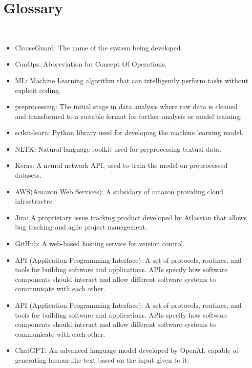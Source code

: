 \chapter{Glossary 
\label{Chapter::Glossary}}\
\begin{itemize}
    \item ClauseGuard: The name of the system being developed. 

    \item ConOps: Abbreviation for Concept Of Operations. 

    \item ML: Machine Learning algorithm that can intelligently perform tasks without explicit coding.
    \item preprocessing: The initial stage in data analysis where raw data is cleaned and transformed to a suitable format for further analysis or model training.



    \item scikit-learn: Python library used for developing the machine learning model. 

    \item NLTK: Natural language toolkit used for preprocessing textual data.  
    \item Keras: A neural network API, used to train the model on preprocessed datasets. 
    \item AWS(Amazon Web Services): A subsidary of amazon providing cloud infrastructre. 
    \item Jira: A proprietary issue tracking product developed by Atlassian that allows bug tracking and agile project management.
    \item GitHub: A web-based hosting service for version control. 

    \item API (Application Programming Interface): A set of protocols, routines, and tools for building software and applications. APIs specify how software components should interact and allow different software systems to communicate with each other.

    \item API (Application Programming Interface): A set of protocols, routines, and tools for building software and applications. APIs specify how software components should interact and allow different software systems to communicate with each other.

    \item ChatGPT: An advanced language model developed by OpenAI, capable of generating human-like text based on the input given to it.


\end{itemize}
